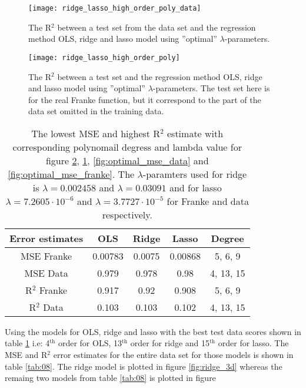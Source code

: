 \documentclass[uio,jmp,amsmath,amssymb,reprint,nofootinbib]{revtex4-1}
\numberwithin{equation}{section}
\begin{document}
\begin{figure}[H]
    \centering
    \texttt{[image: ridge\_lasso\_high\_order\_poly\_data]}
    \caption{The R\(^2\) between a test set from the data set and the regression method OLS, ridge and lasso model using ''optimal'' \(\lambda\)-parameters.}
    \label{fig:optimal_r2_franke}
\end{figure}

\begin{figure}[H]
    \centering
    \texttt{[image: ridge\_lasso\_high\_order\_poly]}
    \caption{The R\(^2\) between a test set and the regression method OLS, ridge and lasso model using ''optimal'' \(\lambda\)-parameters. The test set here is for the real Franke function, but it correspond to the part of the data set omitted in the training data.}
    \label{fig:optimal_r2_data}
\end{figure}

\begin{table}
\begin{tabular}{|c|c|c|c|c|}\hline
Error estimates & OLS & Ridge & Lasso & Degree\\ \hline
MSE Franke & 0.00783 & 0.0075 & 0.00868 & 5, 6, 9 \\ \hline
MSE Data & 0.979 & 0.978 & 0.98 & 4, 13, 15 \\ \hline
R\(^2\) Franke & 0.917 & 0.92 & 0.908 & 5, 6, 9 \\ \hline
R\(^2\) Data & 0.103 & 0.103 & 0.102 & 4, 13, 15 \\ \hline
\end{tabular}
\caption{The lowest MSE and highest R\(^2\) estimate with corresponding polynomail degress and lambda value for figure \ref{fig:optimal_r2_data}, \ref{fig:optimal_r2_franke}, \ref{fig:optimal_mse_data} and \ref{fig:optimal_mse_franke}. The \(\lambda\)-paramters used for ridge is \(\lambda = 0.002458\) and \(\lambda = 0.03091\) and for lasso \(\lambda = 7.2605\cdot 10^{-6}\) and \(\lambda = 3.7727\cdot 10^{-5}\) for Franke and data respectively.}
\label{tab:07}
\end{table}

Using the models for OLS, ridge and lasso with the best test data scores shown in table \ref{tab:07} i.e: 4\(^\text{th}\) order for OLS, 13\(^\text{th}\) order for ridge and 15\(^\text{th}\) order for lasso. The MSE and R\(^2\) error estimates for the entire data set for those models is shown in table \ref{tab:08}. The ridge model is plotted in figure \ref{fig:ridge_3d} whereas the remaing two models from table \ref{tab:08} is plotted in figure
\end{document}
